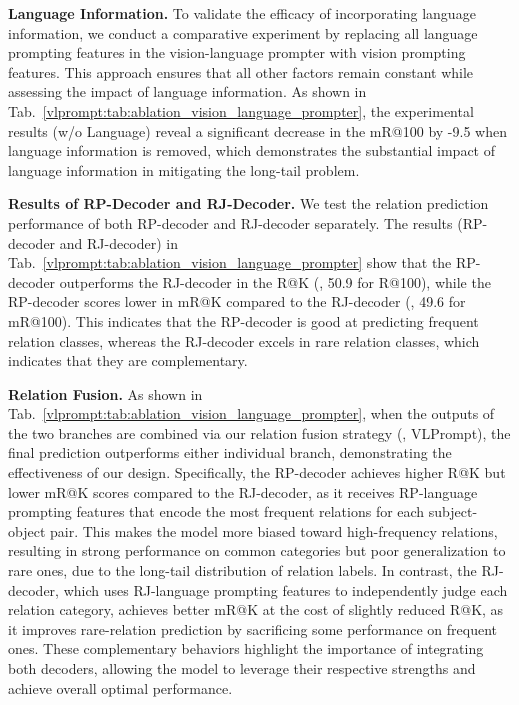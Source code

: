\noindent \textbf{Language Information.}
To validate the efficacy of incorporating language information, we conduct a comparative experiment by replacing all language prompting features in the vision-language prompter with vision prompting features.
This approach ensures that all other factors remain constant while assessing the impact of language information.
As shown in Tab.~\ref{vlprompt:tab:ablation_vision_language_prompter}, the experimental results (w/o Language) reveal a significant decrease in the mR@100 by -9.5 when language information is removed, which demonstrates the substantial impact of language information in mitigating the long-tail problem.

\noindent \textbf{Results of RP-Decoder and RJ-Decoder.}
We test the relation prediction performance of both RP-decoder and RJ-decoder separately.
The results (RP-decoder and RJ-decoder) in Tab.~\ref{vlprompt:tab:ablation_vision_language_prompter} show that the RP-decoder outperforms the RJ-decoder in the R@K (\eg, 50.9  for R@100), while the RP-decoder scores lower in mR@K compared to the RJ-decoder (\eg, 49.6  for mR@100).
This indicates that the RP-decoder is good at predicting frequent relation classes, whereas the RJ-decoder excels in rare relation classes, which indicates that they are complementary.

\noindent \textbf{Relation Fusion.}
As shown in Tab.~\ref{vlprompt:tab:ablation_vision_language_prompter}, when the outputs of the two branches are combined via our relation fusion strategy (\ie, VLPrompt), the final prediction outperforms either individual branch, demonstrating the effectiveness of our design.
Specifically, the RP-decoder achieves higher R@K but lower mR@K scores compared to the RJ-decoder, as it receives RP-language prompting features that encode the most frequent relations for each subject-object pair.
This makes the model more biased toward high-frequency relations, resulting in strong performance on common categories but poor generalization to rare ones, due to the long-tail distribution of relation labels.
In contrast, the RJ-decoder, which uses RJ-language prompting features to independently judge each relation category, achieves better mR@K at the cost of slightly reduced R@K, as it improves rare-relation prediction by sacrificing some performance on frequent ones.
These complementary behaviors highlight the importance of integrating both decoders, allowing the model to leverage their respective strengths and achieve overall optimal performance.

